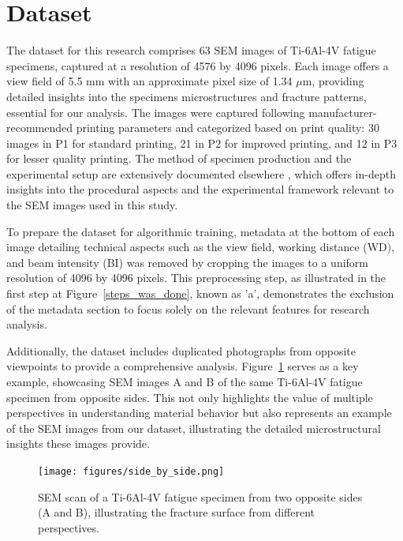 \documentclass[preprint,12pt]{elsarticle}
\begin{document}
\section{Dataset} \label{Sec:dataset}

The dataset for this research comprises 63 SEM images of Ti-6Al-4V fatigue specimens, captured at a resolution of 4576 by 4096 pixels. Each image offers a view field of 5.5 mm with an approximate pixel size of 1.34 $\mu$m, providing detailed insights into the specimens microstructures and fracture patterns, essential for our analysis. The images were captured following manufacturer-recommended printing parameters and categorized based on print quality: 30 images in P1 for standard printing, 21 in P2 for improved printing, and 12 in P3 for lesser quality printing. The method of specimen production and the experimental setup are extensively documented elsewhere \cite{navickaite2022efficient}, which offers in-depth insights into the procedural aspects and the experimental framework relevant to the SEM images used in this study.

To prepare the dataset for algorithmic training, metadata at the bottom of each image detailing technical aspects such as the view field, working distance (WD), and beam intensity (BI) was removed by cropping the images to a uniform resolution of 4096 by 4096 pixels. This preprocessing step, as illustrated in the first step at Figure~\ref{steps_was_done}, known as 'a', demonstrates the exclusion of the metadata section to focus solely on the relevant features for research analysis.


Additionally, the dataset includes duplicated photographs from opposite viewpoints to provide a comprehensive analysis. Figure~\ref{same_material_from_both_sides} serves as a key example, showcasing SEM images A and B of the same Ti-6Al-4V fatigue specimen from opposite sides. This not only highlights the value of multiple perspectives in understanding material behavior but also represents an example of the SEM images from our dataset, illustrating the detailed microstructural insights these images provide.


\begin{figure}[b!]
  \centering
  \texttt{[image: figures/side\_by\_side.png]}
  \caption{SEM scan of a Ti-6Al-4V fatigue specimen from two opposite sides (A and B), illustrating the fracture surface from different perspectives.}
  \label{same_material_from_both_sides}
\end{figure}
\end{document}
